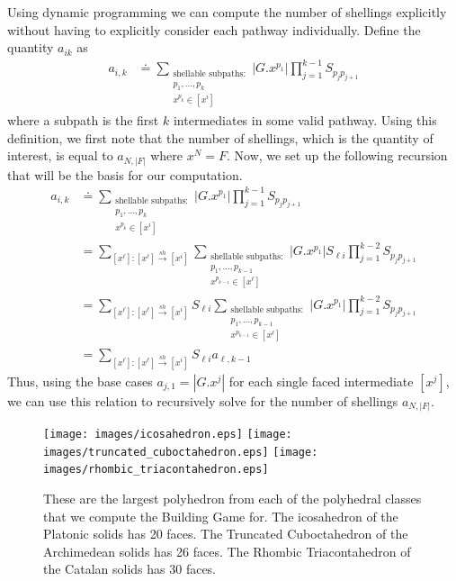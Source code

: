 Using dynamic programming we can compute the number of shellings explicitly without having to explicitly consider each pathway individually. Define the quantity $a_{ik}$ as
\begin{align}
a_{i,k} &\doteq  \sum_{\substack{\text{shellable subpaths}:\\ p_1, \dots, p_k \\ x^{p_k} \in [x^i]}}|G.x^{p_1}|\prod_{j=1}^{k-1}S_{p_j p_{j+1}} \end{align}
where a subpath is the first $k$ intermediates in some valid pathway. Using this definition, we first note that the number of shellings, which is the quantity of interest, is equal to $a_{N,|F|}$ where $x^N = F$. Now, we set up the following recursion that will be the basis for our computation. 
\begin{align}
a_{i,k} &\doteq \sum_{\substack{\text{shellable subpaths}:\\ p_1, \dots, p_k \\ x^{p_k} \in [x^i]}}|G.x^{p_1}|\prod_{j=1}^{k-1}S_{p_j p_{j+1}} \\  
&= \sum_{[x^\ell]:[x^\ell]\xrightarrow{sh}[x^i]} \sum_{\substack{\text{shellable subpaths}:\\ p_1, \dots, p_{k-1} \\ x^{p_{k-1}} \in [x^\ell]}}|G.x^{p_1}|S_{\ell i}\prod_{j=1}^{k-2}S_{p_j p_{j+1}} \\
&= \sum_{[x^\ell]:[x^\ell]\xrightarrow{sh}[x^i]} S_{\ell i} \sum_{\substack{\text{shellable subpaths}:\\ p_1, \dots, p_{k-1} \\ x^{p_{k-1}} \in [x^\ell]}}|G.x^{p_1}|\prod_{j=1}^{k-2}S_{p_j p_{j+1}} \\
&= \sum_{[x^\ell]:[x^\ell]\xrightarrow{sh}[x^i]} S_{\ell i} a_{\ell, k-1}
\end{align}
Thus, using the base cases $a_{j,1} = |G.x^j|$ for each single faced intermediate $[x^j]$, we can use this relation to recursively solve for the number of shellings $a_{N,|F|}$.



\begin{figure}[ht]
\texttt{[image: images/icosahedron.eps]}
\texttt{[image: images/truncated\_cuboctahedron.eps]}
\texttt{[image: images/rhombic\_triacontahedron.eps]}
\caption{These are the largest polyhedron from each of the polyhedral classes that we compute the Building Game for. The icosahedron of the Platonic solids has 20 faces. The Truncated Cuboctahedron of the Archimedean solids has 26 faces. The Rhombic Triacontahedron of the Catalan solids has 30 faces.}
\label{fig:lrgply}
\end{figure}






